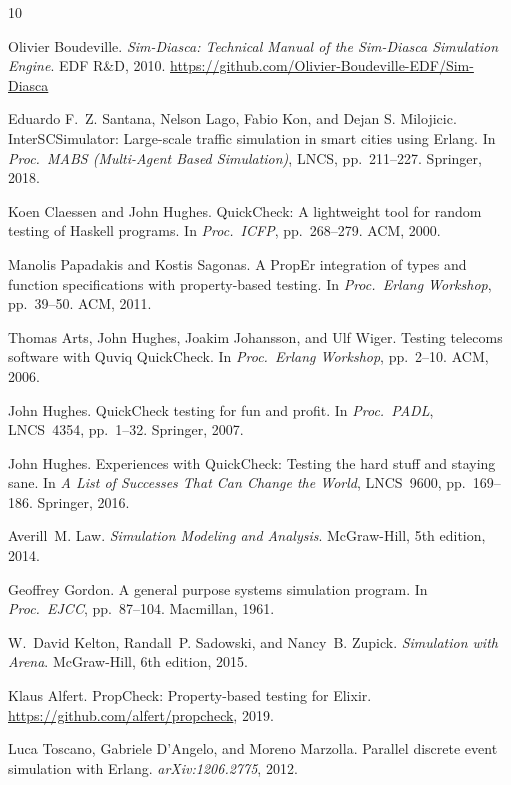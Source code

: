 \documentclass[sigplan,review,anonymous=false]{acmart}
\begin{document}

\begin{thebibliography}{10}

Olivier Boudeville.
\newblock \emph{Sim-Diasca: Technical Manual of the Sim-Diasca Simulation
  Engine}.
\newblock EDF R\&D, 2010.
\newblock \url{https://github.com/Olivier-Boudeville-EDF/Sim-Diasca}

Eduardo F.~Z. Santana, Nelson Lago, Fabio Kon, and Dejan S. Milojicic.
\newblock InterSCSimulator: Large-scale traffic simulation in smart cities
  using Erlang.
\newblock In \emph{Proc.\ MABS (Multi-Agent Based Simulation)}, LNCS,
  pp.~211--227. Springer, 2018.

Koen Claessen and John Hughes.
\newblock QuickCheck: A lightweight tool for random testing of Haskell programs.
\newblock In \emph{Proc.\ ICFP}, pp.~268--279. ACM, 2000.

Manolis Papadakis and Kostis Sagonas.
\newblock A PropEr integration of types and function specifications with
  property-based testing.
\newblock In \emph{Proc.\ Erlang Workshop}, pp.~39--50. ACM, 2011.

Thomas Arts, John Hughes, Joakim Johansson, and Ulf Wiger.
\newblock Testing telecoms software with Quviq QuickCheck.
\newblock In \emph{Proc.\ Erlang Workshop}, pp.~2--10. ACM, 2006.

John Hughes.
\newblock QuickCheck testing for fun and profit.
\newblock In \emph{Proc.\ PADL}, LNCS~4354, pp.~1--32. Springer, 2007.

John Hughes.
\newblock Experiences with QuickCheck: Testing the hard stuff and staying sane.
\newblock In \emph{A List of Successes That Can Change the World}, LNCS~9600,
  pp.~169--186. Springer, 2016.

Averill~M. Law.
\newblock \emph{Simulation Modeling and Analysis}.
\newblock McGraw-Hill, 5th edition, 2014.

Geoffrey Gordon.
\newblock A general purpose systems simulation program.
\newblock In \emph{Proc.\ EJCC}, pp.~87--104. Macmillan, 1961.

W.~David Kelton, Randall~P. Sadowski, and Nancy~B. Zupick.
\newblock \emph{Simulation with Arena}.
\newblock McGraw-Hill, 6th edition, 2015.

Klaus Alfert.
\newblock PropCheck: Property-based testing for Elixir.
\newblock \url{https://github.com/alfert/propcheck}, 2019.

Luca Toscano, Gabriele D'Angelo, and Moreno Marzolla.
\newblock Parallel discrete event simulation with {E}rlang.
\newblock \emph{arXiv:1206.2775}, 2012.

\end{thebibliography}
\end{document}
